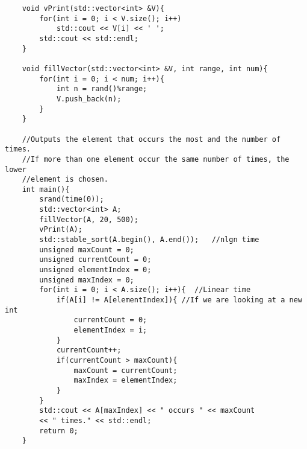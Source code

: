\documentclass{article}
\begin{document}
\begin{enumerate}
\begin{lstlisting}
    void vPrint(std::vector<int> &V){
        for(int i = 0; i < V.size(); i++)
            std::cout << V[i] << ' ';
        std::cout << std::endl;
    }

    void fillVector(std::vector<int> &V, int range, int num){
        for(int i = 0; i < num; i++){
            int n = rand()%range;
            V.push_back(n);
        }
    }

    //Outputs the element that occurs the most and the number of times.
    //If more than one element occur the same number of times, the lower
    //element is chosen.
    int main(){
        srand(time(0));
        std::vector<int> A;
        fillVector(A, 20, 500);
        vPrint(A);
        std::stable_sort(A.begin(), A.end());   //nlgn time
        unsigned maxCount = 0;
        unsigned currentCount = 0;
        unsigned elementIndex = 0;
        unsigned maxIndex = 0;
        for(int i = 0; i < A.size(); i++){  //Linear time
            if(A[i] != A[elementIndex]){ //If we are looking at a new int
                currentCount = 0;
                elementIndex = i;
            }
            currentCount++;
            if(currentCount > maxCount){
                maxCount = currentCount;
                maxIndex = elementIndex;
            }
        }
        std::cout << A[maxIndex] << " occurs " << maxCount 
        << " times." << std::endl;
        return 0;
    }
            \end{lstlisting}
\end{enumerate}
\end{document}
